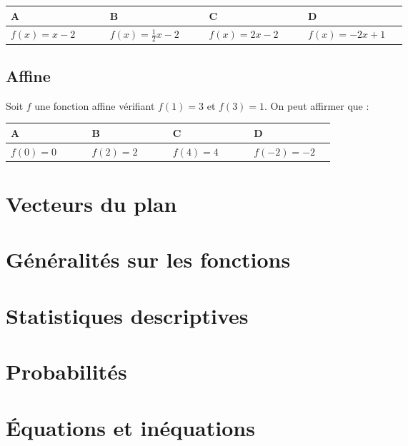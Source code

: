 \documentclass[oneside,12pt]{article}
\let\oldsection\section
\renewcommand{\section}{\newpage\oldsection}
\begin{document}
\begin{center}
	\renewcommand{\arraystretch}{1.35}
	\begin{tabular}{| P{0.22\linewidth} | P{0.22\linewidth} | P{0.22\linewidth} | P{0.22\linewidth} |} \hline
	A & B & C & D \\ \hline
	$f(x)=x-2$ & $f(x)=\frac{1}{2}x-2$ & $f(x)=2x-2$ & $f(x)=-2x+1$ \\\hline
	\end{tabular}
\end{center}



\subsection{Affine}
Soit $f$ une fonction affine vérifiant $f(1)=3$ et $f(3)=1$. On peut affirmer que :

\begin{center}
	\renewcommand{\arraystretch}{1.35}
	\begin{tabular}{| P{0.22\linewidth} | P{0.22\linewidth} | P{0.22\linewidth} | P{0.22\linewidth} |} \hline
	A & B & C & D \\ \hline
	$f(0)=0$ & $f(2)=2$ & $f(4)=4$ & $f(-2)=-2$ \\ \hline
	\end{tabular}
\end{center}




\section{Vecteurs du plan}


\section{Généralités sur les fonctions}


\section{Statistiques descriptives}


\section{Probabilités}


\section{Équations et inéquations}
\end{document}
